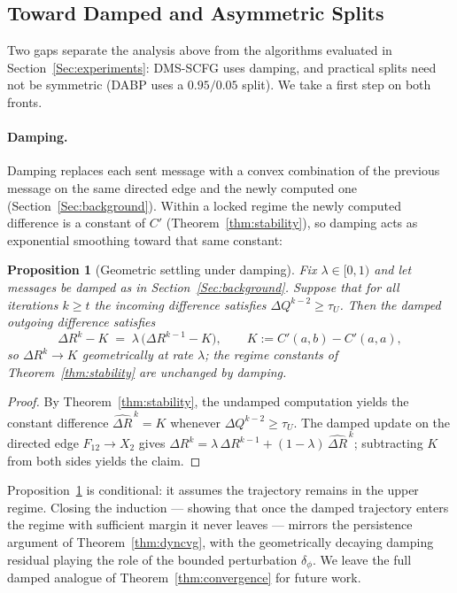 \documentclass[letterpaper]{article} %
\newtheorem{proposition}[theorem]{Proposition}
\theoremstyle{definition}
\theoremstyle{remark}
\begin{document}
\subsection{Toward Damped and Asymmetric Splits}\label{sec:extensions}
Two gaps separate the analysis above from the algorithms evaluated in Section~\ref{Sec:experiments}: DMS-SCFG uses damping, and practical splits need not be symmetric (DABP uses a $0.95/0.05$ split). We take a first step on both fronts.

\paragraph{Damping.}
Damping replaces each sent message with a convex combination of the previous message on the same directed edge and the newly computed one (Section~\ref{Sec:background}). Within a locked regime the newly computed difference is a constant of $C'$ (Theorem~\ref{thm:stability}), so damping acts as exponential smoothing toward that same constant:
\begin{proposition}[Geometric settling under damping]\label{prop:damped}
Fix $\lambda \in [0,1)$ and let messages be damped as in Section~\ref{Sec:background}. Suppose that for all iterations $k \geq t$ the incoming difference satisfies $\Delta Q^{k-2} \geq \tau_U$. Then the damped outgoing difference satisfies
\[
    \Delta R^{k} - K \;=\; \lambda\,\bigl(\Delta R^{k-1} - K\bigr),
    \qquad K := C'(a,b) - C'(a,a),
\]
so $\Delta R^k \to K$ geometrically at rate $\lambda$; the regime constants of Theorem~\ref{thm:stability} are unchanged by damping.
\end{proposition}
\begin{proof}
By Theorem~\ref{thm:stability}, the undamped computation yields the constant difference $\widehat{\Delta R}^{\,k} = K$ whenever $\Delta Q^{k-2} \geq \tau_U$. The damped update on the directed edge $F_{12} \to X_2$ gives $\Delta R^{k} = \lambda\, \Delta R^{k-1} + (1-\lambda)\, \widehat{\Delta R}^{\,k}$; subtracting $K$ from both sides yields the claim.
\end{proof}
Proposition~\ref{prop:damped} is conditional: it assumes the trajectory remains in the upper regime. Closing the induction --- showing that once the damped trajectory enters the regime with sufficient margin it never leaves --- mirrors the persistence argument of Theorem~\ref{thm:dyncvg}, with the geometrically decaying damping residual playing the role of the bounded perturbation $\delta_\phi$. We leave the full damped analogue of Theorem~\ref{thm:convergence} for future work.
\end{document}
